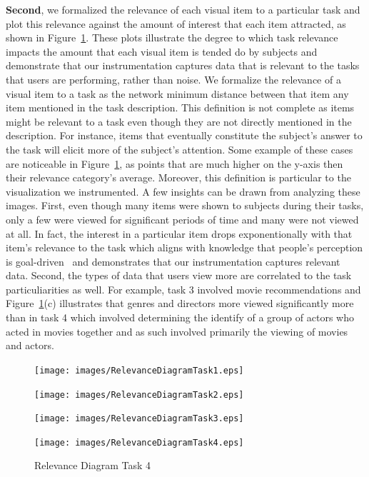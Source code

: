 \textbf{Second}, we formalized the relevance of each visual item to a particular task and plot this relevance against the amount of interest that each item attracted, as shown in Figure~\ref{fig:RelevanceDiagram}. These plots illustrate the degree to which task relevance impacts the amount that each visual item is tended do by subjects and demonstrate that our instrumentation captures data that is relevant to the tasks that users are performing, rather than noise. 
We formalize the relevance of a visual item to a task as the network minimum distance between that item any item mentioned in the task description.  This definition is not complete as items might be relevant to a task even though they are not directly mentioned in the description.  For instance, items that eventually constitute the subject's answer to the task will elicit more of the subject's attention. Some example of these cases are noticeable in Figure~\ref{fig:RelevanceDiagram}, as points that are much higher on the y-axis then their relevance category's average. Moreover, this definition is particular to the visualization we instrumented.
A few insights can be drawn from analyzing these images. First, even though many items were shown to subjects during their tasks, only a few were viewed for significant periods of time and many were not viewed at all. In fact, the interest in a particular item drops exponentionally with that item's relevance to the task which aligns with knowledge that people's perception is goal-driven~\cite{something} and demonstrates that our instrumentation captures relevant data.  Second, the types of data that users view more are correlated to the task particuliarities as well. For example, task 3 involved movie recommendations and Figure~\ref{fig:RelevanceDiagram}(c) illustrates that genres and directors more viewed significantly more than in task 4 which involved determining the identify of a group of actors who acted in movies together and as such involved primarily the viewing of movies and actors.  




\begin{figure}[!hbt]
  \centering
  \texttt{[image: images/RelevanceDiagramTask1.eps]}
	\caption*{Relevance Diagram Task 1}
	\texttt{[image: images/RelevanceDiagramTask2.eps]}
	\caption*{Relevance Diagram Task 2}
	\texttt{[image: images/RelevanceDiagramTask3.eps]}
	\caption*{Relevance Diagram Task 3}
	\texttt{[image: images/RelevanceDiagramTask4.eps]}
	\caption*{Relevance Diagram Task 4}
	\label{fig:RelevanceDiagram}
\end{figure}


